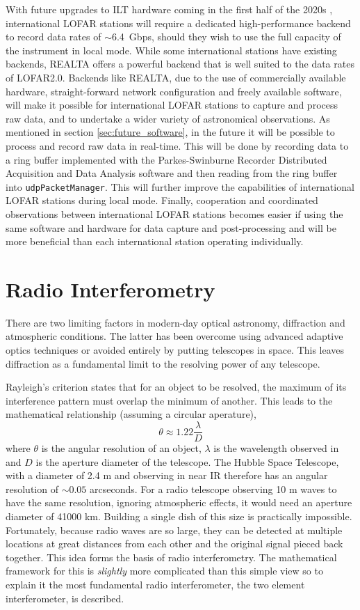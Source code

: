 With future upgrades to ILT hardware coming in the first half of the 2020s \citep[mainly, LOFAR2.0;][]{Edler2021}, international LOFAR stations will require a dedicated high-performance backend to record data rates of $\sim$6.4~Gbps, should they wish to use the full capacity of the instrument in local mode. While some international stations have existing backends, REALTA offers a powerful backend that is well suited to the data rates of LOFAR2.0. Backends like REALTA, due to the use of commercially available hardware, straight-forward network configuration and freely available software, will make it possible for international LOFAR stations to capture and process raw data, and to undertake a wider variety of astronomical observations. As mentioned in section \ref{sec:future_software}, in the future it will be possible to process and record raw data in real-time. This will be done by recording data to a ring buffer implemented with the Parkes-Swinburne Recorder Distributed Acquisition and Data Analysis software \citep[PSRDADA;][]{PSRDADA} and then reading from the ring buffer into \texttt{udpPacketManager}. This will further improve the capabilities of international LOFAR stations during local mode. Finally, cooperation and coordinated observations between international LOFAR stations becomes easier if using the same software and hardware for data capture and post-processing and will be more beneficial than each international station operating individually.

\section{Radio Interferometry}
\label{sec:interferometry}
There are two limiting factors in modern-day optical astronomy, diffraction and atmospheric conditions. The latter has been overcome using advanced adaptive optics techniques or avoided entirely by putting telescopes in space. This leaves diffraction as a fundamental limit to the resolving power of any telescope.

Rayleigh's criterion states that for an object to be resolved, the maximum of its interference pattern must overlap the minimum of another. This leads to the mathematical relationship (assuming a circular aperature), $$\theta \approx 1.22 \frac{\lambda}{D}$$ where $\theta$ is the angular resolution of an object, $\lambda$ is the wavelength observed in and $D$ is the aperture diameter of the telescope. The Hubble Space Telescope, with a diameter of 2.4 m and observing in near IR therefore has an angular resolution of $\sim 0.05$ arcseconds. For a radio telescope observing 10 m waves to have the same resolution, ignoring atmospheric effects, it would need an aperture diameter of 41000 km. Building a single dish of this size is practically impossible. Fortunately, because radio waves are so large, they can be detected at multiple locations at great distances from each other and the original signal pieced back together. This idea forms the basis of radio interferometry.
The mathematical framework for this is \textit{slightly} more complicated than this simple view so to explain it the most fundamental radio interferometer, the two element interferometer, is described.

